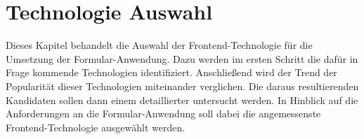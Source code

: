 \section{Technologie Auswahl}

Dieses Kapitel behandelt die Auswahl der Frontend-Technologie für die Umsetzung der Formular-Anwendung. Dazu  werden im ersten Schritt die dafür in Frage kommende Technologien identifiziert.  Anschließend wird der Trend der Popularität dieser Technologien miteinander verglichen. Die daraus resultierenden Kandidaten sollen dann einem detaillierter untersucht werden. In Hinblick auf die Anforderungen an die Formular-Anwendung soll dabei die angemessenste Frontend-Technologie ausgewählt werden.



